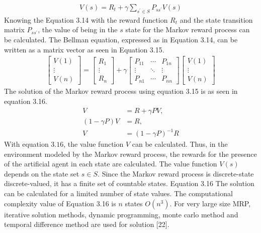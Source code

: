 \documentclass[12pt,twoside,a4]{mwbk}
\begin{document}
\begin{subequations}
\begin{align}
    V(s)=R_{t}+\gamma \sum_{s^{\prime} \in S} P_{s s^{\prime}} V(s)
\end{align}
\end{subequations}
Knowing the Equation 3.14 with the reward function $R_{t}$ and the state transition matrix $P_{s s^{\prime}}$, the value of being in the $s$ state for the Markov reward process can be calculated. The Bellman equation, expressed as in Equation 3.14, can be written as a matrix vector as seen in Equation 3.15.
\begin{subequations}
\begin{align}
    \left[\begin{array}{c}
V(1) \\
\vdots \\
V(n)
\end{array}\right]=\left[\begin{array}{c}
R_{1} \\
\vdots \\
R_{n}
\end{array}\right]+\gamma\left[\begin{array}{ccc}
P_{11} & \cdots & P_{1 n} \\
\vdots & \ddots & \vdots \\
P_{n 1} & \cdots & P_{n n}
\end{array}\right]\left[\begin{array}{c}
V(1) \\
\vdots \\
V(n)
\end{array}\right]
\end{align}
\end{subequations}
The solution of the Markov reward process using equation 3.15 is as seen in equation 3.16.
\begin{subequations}
\begin{align}
    V &=R+\gamma P V, \\
    (1-\gamma P) V &=R, \\
    V &=(1-\gamma P)^{-1} R
\end{align}
\end{subequations}
With equation $3.16$, the value function $V$ can be calculated. Thus, in the environment modeled by the Markov reward process, the rewards for the presence of the artificial agent in each state are calculated. The value function $V(s)$ depends on the state set $s \in S$. Since the Markov reward process is discrete-state discrete-valued, it has a finite set of countable states. Equation 3.16 The solution can be calculated for a limited number of state values. The computational complexity value of Equation 3.16 is $n$ states $O\left(n^{3}\right)$. For very large size MRP, iterative solution methods, dynamic programming, monte carlo method and temporal difference method are used for solution [22].
\end{document}
